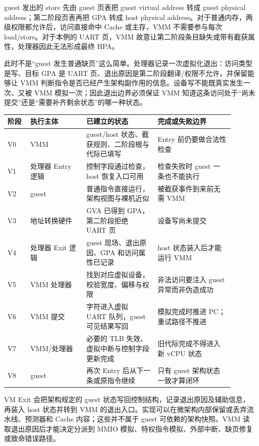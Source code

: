 guest 发出的 store 先由 guest 页表把 guest virtual address 转成 guest physical address；第二阶段页表再把 GPA 转成 host physical address。对于普通内存，两级权限都允许后，访问直接命中 Cache 或主存，VMM 不需要参与每次 load/store。对于本例的 UART 页，VMM 故意让第二阶段条目缺失或带有截获属性，处理器因此无法形成最终 HPA。

此时不是“guest 发生普通缺页”这么简单。处理器记录一次虚拟化退出：访问类型是写、目标 GPA 是 UART 页、退出原因是第二阶段翻译/权限不允许，并保留能够让 VMM 判断指令是否已经产生架构副作用的信息。设备写不能既真实发生一次、又被 VMM 模拟一次；因此退出边界必须保证 VMM 知道这条访问处于“尚未提交”还是“需要补齐剩余状态”的哪一种状态。

\begin{longtable}{L{0.09\linewidth}L{0.22\linewidth}L{0.29\linewidth}L{0.30\linewidth}}
\toprule
阶段 & 执行主体 & 已建立的状态 & 完成或失败边界 \\
\midrule
V0 & VMM & guest/host 状态、截获规则、二阶段根与代际已填写 & Entry 前仍要做合法性检查 \\\tablerowrule
V1 & 处理器 Entry 逻辑 & 控制字段通过检查，host 恢复入口可用 & 检查失败时 guest 一条也不能执行 \\\tablerowrule
V2 & guest & 普通指令直接运行，架构视图与裸机近似 & 被截获事件到来前无需 VMM \\\tablerowrule
V3 & 地址转换硬件 & GVA 已得到 GPA，第二阶段拒绝 UART 页 & 设备写尚未提交 \\\tablerowrule
V4 & 处理器 Exit 逻辑 & guest 现场、退出原因、GPA 和访问属性已记录 & host 状态装入后才能运行 VMM \\\tablerowrule
V5 & VMM 处理器 & 找到对应虚拟设备，校验宽度、偏移与权限 & 非法访问要注入 guest 异常而非伪造成功 \\\tablerowrule
V6 & VMM 提交 & 字符进入虚拟 UART 队列，guest 可见结果写回 & 模拟完成时推进 PC；重试路径不推进 \\\tablerowrule
V7 & VMM/处理器 & 必要的 TLB 失效、虚拟中断与控制字段更新完成 & 旧代际完成不得进入新 vCPU 状态 \\\tablerowrule
V8 & guest & 再次 Entry 后从下一条或原指令继续 & 只有 guest 架构状态一致才算闭环 \\
\bottomrule
\end{longtable}


VM Exit 会把架构规定的 guest 状态写回控制结构，记录退出原因及辅助信息，再装入 host 状态并转到 VMM 的退出入口。实现可以在微架构内部保留或丢弃流水线、预测器和 Cache 内容；这些并不属于 guest 可依赖的架构快照。VMM 读取退出原因后才能决定分派到 MMIO 模拟、特权指令模拟、外部中断、缺页修复或致命错误路径。

